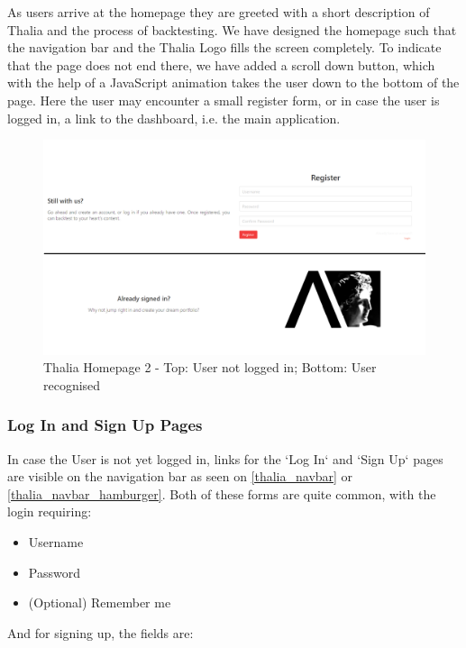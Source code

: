 \documentclass[main.tex]{subfiles}
\begin{document}
As users arrive at the homepage they are greeted with a short description of Thalia and the process of backtesting. We have designed the homepage such that the navigation bar and the Thalia Logo fills the screen completely. To indicate that the page does not end there, we have added a scroll down button, which with the help of a JavaScript \cite{js} animation takes the user down to the bottom of the page. Here the user may encounter a small register form, or in case the user is logged in, a link to the dashboard, i.e. the main application.

\begin{figure}[H]
   \centering
   \includegraphics[width=\textwidth]{08Appendices/081User/081Pictures/homepage_bottom.png}
   \caption{Thalia Homepage 2 - Top: User not logged in; Bottom: User recognised}
   \label{thalia_home_bottom}
\end{figure}

\subsubsection*{Log In and Sign Up Pages}

In case the User is not yet logged in, links for the `Log In` and `Sign Up` pages are visible on the navigation bar as seen on \figurename{\ref{thalia_navbar}} or \figurename{\ref{thalia_navbar_hamburger}}.
Both of these forms are quite common, with the login requiring:

\begin{itemize}
    \item Username
    \item Password
    \item (Optional) Remember me
\end{itemize}

And for signing up, the fields are:
\end{document}

